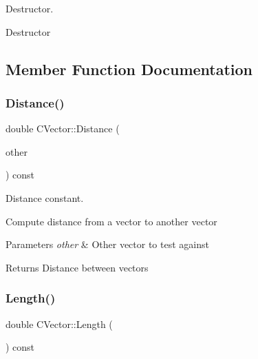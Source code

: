 Destructor. 

Destructor 

\subsection{Member Function Documentation}
\mbox{\label{class_c_vector_a3b81ff3e8be09903b271d6712e1ffa0d}} 
\subsubsection{\texorpdfstring{Distance()}{Distance()}}
{\footnotesize\ttfamily double C\+Vector\+::\+Distance (\begin{DoxyParamCaption}\item[{const \mbox{\hyperlink{class_c_vector}{C\+Vector}} \&}]{other }\end{DoxyParamCaption}) const}



Distance constant. 

Compute distance from a vector to another vector


\begin{DoxyCode}{0}
\end{DoxyCode}
 
\begin{DoxyParams}{Parameters}
{\em other} & Other vector to test against \\
\hline
\end{DoxyParams}
\begin{DoxyReturn}{Returns}
Distance between vectors 
\end{DoxyReturn}
\mbox{\label{class_c_vector_ac5a1307d7d4fe0122fba34448483fd5d}} 
\subsubsection{\texorpdfstring{Length()}{Length()}}
{\footnotesize\ttfamily double C\+Vector\+::\+Length (\begin{DoxyParamCaption}{ }\end{DoxyParamCaption}) const}



